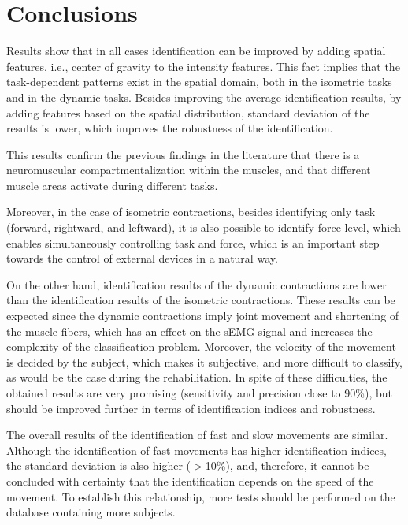 \section{Conclusions}

Results show that in all cases identification can be improved by adding spatial features, i.e., center of gravity to the intensity features. This fact implies that the task-dependent patterns exist in the spatial domain, both in the isometric tasks and in the dynamic tasks. Besides improving the average identification results, by adding features based on the spatial distribution, standard deviation of the results is lower, which improves the robustness of the identification.

This results confirm the previous findings in the literature \citep{Hargrove2007, Farina2008, Jordanic2016a, Zhou2007} that there is a  neuromuscular compartmentalization within the muscles, and that different muscle areas activate during different tasks. %

Moreover, in the case of isometric contractions, besides identifying only task (forward, rightward, and leftward), it is also possible to identify force level, which enables simultaneously controlling task and force, which is an important step towards the control of external devices in a natural way. 

On the other hand, identification results of the dynamic contractions are lower than the identification results of the isometric contractions. These results can be expected since the dynamic contractions imply joint movement and shortening of the muscle fibers, which has an effect on the sEMG signal and increases the complexity of the classification problem. Moreover, the velocity of the movement is decided by the subject, which makes it subjective, and more difficult to classify, as would be the case during the rehabilitation. In spite of these difficulties, the obtained results are very promising (sensitivity and precision close to 90\%), but should be improved further in terms of identification indices and robustness.

The overall results of the identification of fast and slow movements are similar. Although the identification of fast movements has higher identification indices, the standard deviation is also higher ($>$10\%), and, therefore, it cannot be concluded with certainty that the  identification depends on the speed of the movement. To establish this relationship, more tests should be performed on the database containing more subjects.

